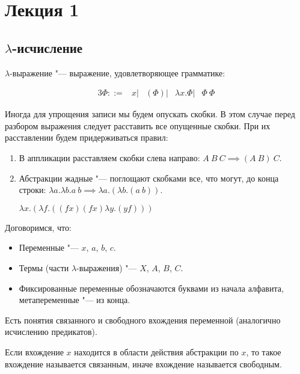 \section{Лекция 1}

\subsection{$\lambda$-исчисление}

\begin{definition}
	$\lambda$-выражение "--- выражение, удовлетворяющее грамматике:
	\begin{bnf}
	\begin{alignat*}{3}
		\Phi ::= & x
		       | & \left(\Phi\right) 
		       | & \lambda{}x.\Phi 
		       | & \Phi \ \Phi        
	\end{alignat*}
	\end{bnf}
\end{definition}

Иногда для упрощения записи мы будем опускать скобки. В этом случае перед разбором выражения следует расставить все опущенные скобки. При их расставлении будем придерживаться правил:
\begin{enumerate}
	\item В аппликации расставляем скобки слева направо: $A \ B \ C \implies (A \ B) \ C$.
	\item Абстракции жадные "--- поглощают скобками все, что могут, до конца строки: 
	$\lambda{}a.\lambda{}b.a \ b \implies \lambda{}a.(\lambda{}b.(a \ b))$.
	\vspace{1mm}
	\begin{example}
		$\lambda{}x.(\lambda{}f.((f x) (f x) \lambda{}y.(y f)))$
	\end{example}
\end{enumerate}

Договоримся, что:
\begin{itemize}
	\item Переменные "--- $x$, $a$, $b$, $c$.
	\item Термы (части $\lambda$-выражения) "--- $X$, $A$, $B$, $C$.
	\item Фиксированные переменные обозначаются буквами из начала алфавита, метапеременные "--- из конца.
\end{itemize}

Есть понятия связанного и свободного вхождения переменной (аналогично исчислению предикатов).

\begin{definition}
	Если вхождение $x$ находится в области действия абстракции по $x$, то такое вхождение называется связанным, иначе вхождение называется свободным.
\end{definition}

